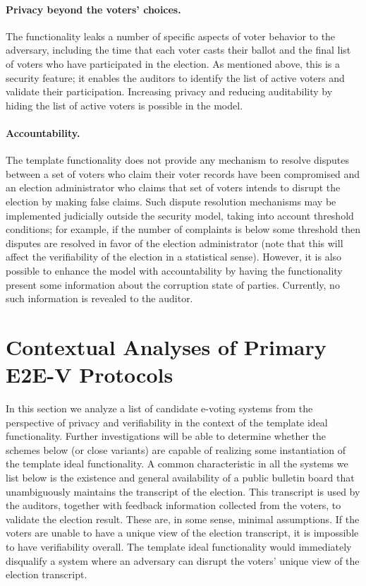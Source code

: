 \paragraph{Privacy beyond the voters' choices.} The functionality
leaks a number of specific aspects of voter behavior to the adversary,
including the time that each voter casts their ballot and the final
list of voters who have participated in the election. As mentioned
above, this is a security feature; it enables the auditors to identify
the list of active voters and validate their participation. Increasing
privacy and reducing auditability by hiding the list of active voters
is possible in the model.

\paragraph{Accountability.} The template functionality does not
provide any mechanism to resolve disputes between a set of voters who
claim their voter records have been compromised and an election
administrator who claims that set of voters intends to disrupt the
election by making false claims. Such dispute resolution mechanisms
may be implemented judicially outside the security model, taking into
account threshold conditions; for example, if the number of complaints
is below some threshold then disputes are resolved in favor of the
election administrator (note that this will affect the verifiability
of the election in a statistical sense). However, it is also possible
to enhance the model with accountability by having the functionality
present some information about the corruption state of parties.
Currently, no such information is revealed to the auditor.

\section{Contextual Analyses of Primary E2E-V Protocols}

In this section we analyze a list of candidate e-voting systems from
the perspective of privacy and verifiability in the context of the
template ideal functionality. Further investigations will be able to
determine whether the schemes below (or close variants) are capable of
realizing some instantiation of the template ideal functionality. A
common characteristic in all the systems we list below is the
existence and general availability of a public bulletin board that
unambiguously maintains the transcript of the election. This
transcript is used by the auditors, together with feedback information
collected from the voters, to validate the election result. These are,
in some sense, minimal assumptions. If the voters are unable to have a
unique view of the election transcript, it is impossible to have
verifiability overall. The template ideal functionality would
immediately disqualify a system where an adversary can disrupt the
voters' unique view of the election transcript.

